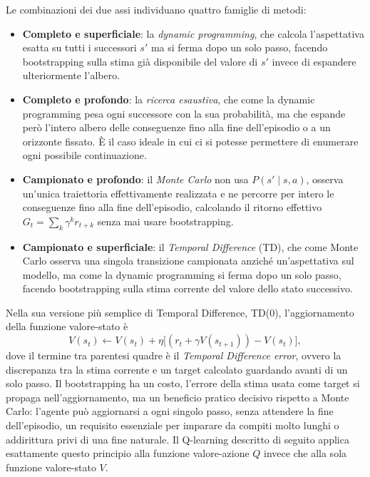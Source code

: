 Le combinazioni dei due assi individuano quattro famiglie di metodi:

\begin{itemize}
  \item \textbf{Completo e superficiale}: la \emph{dynamic programming},
        che calcola l'aspettativa esatta su tutti i successori $s'$ ma si
        ferma dopo un solo passo, facendo bootstrapping sulla stima già
        disponibile del valore di $s'$ invece di espandere ulteriormente
        l'albero.
  \item \textbf{Completo e profondo}: la \emph{ricerca esaustiva}, che
        come la dynamic programming pesa ogni successore con la sua
        probabilità, ma che espande però l'intero
        albero delle conseguenze fino alla fine dell'episodio o a un
        orizzonte fissato. È il caso ideale in cui ci si potesse
        permettere di enumerare ogni possibile continuazione.
  \item \textbf{Campionato e profondo}: il \emph{Monte Carlo} non
        usa $P(s'\mid s,a)$, osserva un'unica traiettoria
        effettivamente realizzata e ne percorre per intero le conseguenze
        fino alla fine dell'episodio, calcolando il ritorno effettivo
        $G_t = \sum_k \gamma^k r_{t+k}$ senza mai usare bootstrapping.
  \item \textbf{Campionato e superficiale}: il \emph{Temporal
          Difference} (TD), che come Monte Carlo osserva una singola
        transizione campionata anziché un'aspettativa sul modello, ma
        come la dynamic programming si ferma dopo un solo passo,
        facendo bootstrapping sulla stima corrente del valore dello stato
        successivo.
\end{itemize}

Nella sua versione più semplice di Temporal Difference, TD(0),
l'aggiornamento della funzione valore-stato è
\[V(s_t) \leftarrow V(s_t) + \eta\big[(r_t + \gamma V(s_{t+1})) - V(s_t)\big],\]
dove il termine tra parentesi quadre è il \emph{Temporal Difference
  error}, ovvero la discrepanza tra la stima corrente e un target
calcolato guardando avanti di un solo passo. Il bootstrapping ha un costo,
l'errore della stima usata come target si propaga nell'aggiornamento, ma
un beneficio pratico decisivo rispetto a Monte Carlo: l'agente può
aggiornarsi a ogni singolo passo, senza attendere la fine dell'episodio,
un requisito essenziale per imparare da compiti molto lunghi o
addirittura privi di una fine naturale. Il Q-learning descritto di
seguito applica esattamente questo principio alla funzione valore-azione
$Q$ invece che alla sola funzione valore-stato $V$.

